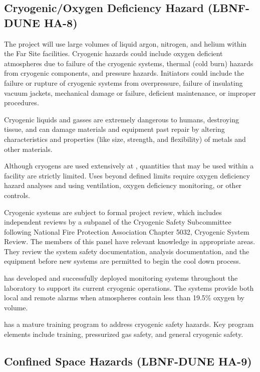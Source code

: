 \subsection{Cryogenic/Oxygen Deficiency Hazard (LBNF-DUNE HA-8)}

The  project will use large volumes of liquid
argon, nitrogen, and helium within the Far Site facilities. Cryogenic
hazards could include oxygen deficient atmospheres due to failure of
the cryogenic systems, thermal (cold burn) hazards from cryogenic
components, and pressure hazards. Initiators could include the failure
or rupture of cryogenic systems from overpressure, failure of
insulating vacuum jackets, mechanical damage or failure, deficient
maintenance, or improper procedures.

Cryogenic liquids and gasses are extremely dangerous to humans,
destroying tissue, and can damage materials and equipment past repair
by altering characteristics and properties (like size, strength, and
flexibility) of metals and other materials.

Although cryogens are used extensively at \fnal, quantities that may
be used within a facility are strictly limited. Uses beyond defined
limits require oxygen deficiency hazard analyses and using
ventilation, oxygen deficiency monitoring, or other controls.

Cryogenic systems are subject to formal project review, which includes
independent reviews by a subpanel of the Cryogenic Safety Subcommittee
following National Fire Protection Association Chapter 5032, Cryogenic
System Review. The members of this panel have relevant knowledge in
appropriate areas. They review the system safety documentation,
 analysis documentation, and the equipment before new
systems are permitted to begin the cool down process.

\fnal has developed and successfully deployed  monitoring
systems throughout the laboratory to support its current cryogenic
operations. The systems provide both local and remote alarms when
atmospheres contain less than 19.5\% oxygen by volume.

\fnal has a mature training program to address cryogenic safety
hazards. Key program elements include  training,
pressurized gas safety, and general cryogenic safety.


\subsection{Confined Space Hazards (LBNF-DUNE HA-9)}

